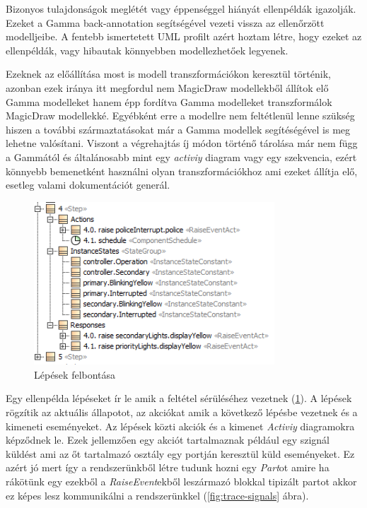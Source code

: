 Bizonyos tulajdonságok meglétét vagy éppenséggel hiányát ellenpéldák igazolják. Ezeket a Gamma back-annotation segítségével vezeti vissza az ellenőrzött modelljeibe. A fentebb ismertetett UML profilt azért hoztam létre, hogy ezeket az ellenpéldák, vagy hibautak könnyebben modellezhetőek legyenek.

Ezeknek az előállítása most is modell transzformációkon keresztül történik, azonban ezek iránya itt megfordul nem MagicDraw modellekből állítok elő Gamma modelleket hanem épp fordítva Gamma modelleket transzformálok MagicDraw modellekké. Egyébként erre a modellre nem feltétlenül lenne szükség hiszen a további származtatásokat már a Gamma modellek segítéségével is meg lehetne valósítani. Viszont a végrehajtás íj módon történő tárolása már nem függ a Gammától és általánosabb mint egy \emph{activiy} diagram vagy egy szekvencia, ezért könnyebb bemenetként használni olyan transzformációkhoz ami ezeket állítja elő, esetleg valami dokumentációt generál.

\begin{figure}[!ht]
	\centering
	\includegraphics[width=90mm, keepaspectratio]{figures/contribution/steps.png}
	\caption{Lépések felbontása}
	\label{fig:steps}
\end{figure}

Egy ellenpélda lépéseket ír le amik a feltétel sérüléséhez vezetnek (\ref{fig:steps}). A lépések rögzítik az aktuális állapotot, az akciókat amik a következő lépésbe vezetnek és a kimeneti eseményeket.
Az lépések közti akciók és a kimenet \emph{Activiy} diagramokra képződnek le. Ezek jellemzően egy akciót tartalmaznak például egy szignál küldést ami az őt tartalmazó osztály egy portján keresztül küld eseményeket. Ez azért jó mert így a rendszerünkből létre tudunk hozni egy \emph{Part}ot amire ha rákötünk egy ezekből a \emph{RaiseEvent}ekből leszármazó blokkal tipizált partot akkor ez képes lesz kommunikálni a rendszerünkkel (\ref{fig:trace-signals} ábra).

